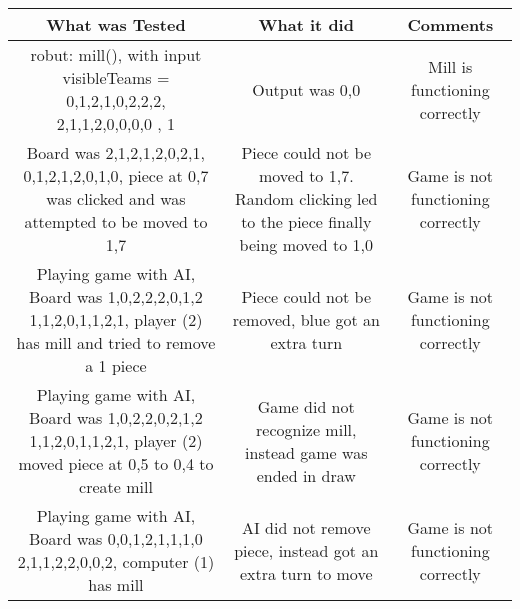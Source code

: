 \documentclass[12pt]{article}
\begin{document}
	\begin{tabularx}{\linewidth}{|C|C|C|}
		\hline 
		What was Tested & What it did & Comments \\
		\hline 
		robut: mill(), with input visibleTeams = {{0,1,2,1,0,2,2,2}, {2,1,1,2,0,0,0,0}} , 1 & Output was {0,0} & Mill is functioning correctly \\ \hline 
		Board was {{2,1,2,1,2,0,2,1}, {0,1,2,1,2,0,1,0}}, piece at 0,7 was clicked and was attempted to be moved to 1,7 & Piece could not be moved to 1,7. Random clicking led to the piece finally being moved to 1,0 & Game is not functioning correctly \\ \hline 
		Playing game with AI, Board was {{1,0,2,2,2,0,1,2} {1,1,2,0,1,1,2,1}}, player (2) has mill and tried to remove a 1 piece & Piece could not be removed, blue got an extra turn & Game is not functioning correctly \\
		\hline 
		Playing game with AI, Board was {{1,0,2,2,0,2,1,2} {1,1,2,0,1,1,2,1}}, player (2) moved piece at 0,5 to 0,4 to create mill & Game did not recognize mill, instead game was ended in draw & Game is not functioning correctly \\ \hline 
		Playing game with AI, Board was {{0,0,1,2,1,1,1,0} {2,1,1,2,2,0,0,2}}, computer (1) has mill & AI did not remove piece, instead got an extra turn to move & Game is not functioning correctly \\ 
		\hline 
		\end{tabularx}	
\end{document}
